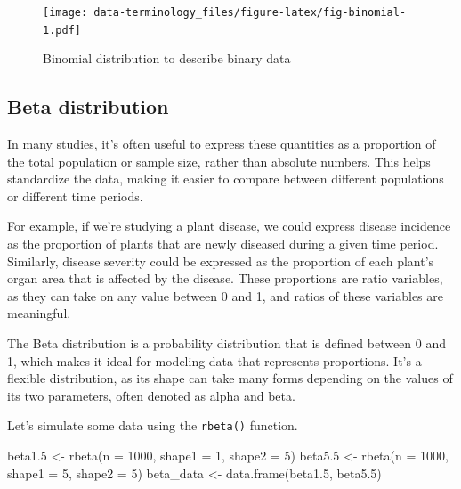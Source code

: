 \documentclass[
  letterpaper,
]{book}
\newenvironment{Shaded}{\begin{snugshade}}{\end{snugshade}}
\newcommand{\AttributeTok}[1]{\textcolor[rgb]{0.40,0.45,0.13}{#1}}
\newcommand{\DecValTok}[1]{\textcolor[rgb]{0.68,0.00,0.00}{#1}}
\newcommand{\FloatTok}[1]{\textcolor[rgb]{0.68,0.00,0.00}{#1}}
\newcommand{\FunctionTok}[1]{\textcolor[rgb]{0.28,0.35,0.67}{#1}}
\newcommand{\NormalTok}[1]{\textcolor[rgb]{0.00,0.23,0.31}{#1}}
\newcommand{\OtherTok}[1]{\textcolor[rgb]{0.00,0.23,0.31}{#1}}
\begin{document}
\begin{figure}

\texttt{[image: data-terminology\_files/figure-latex/fig-binomial-1.pdf]} \hfill{}

\caption{\label{fig-binomial}Binomial distribution to describe binary
data}

\end{figure}

\hypertarget{beta-distribution}{%
\subsection{Beta distribution}\label{beta-distribution}}

In many studies, it's often useful to express these quantities as a
proportion of the total population or sample size, rather than absolute
numbers. This helps standardize the data, making it easier to compare
between different populations or different time periods.

For example, if we're studying a plant disease, we could express disease
incidence as the proportion of plants that are newly diseased during a
given time period. Similarly, disease severity could be expressed as the
proportion of each plant's organ area that is affected by the disease.
These proportions are ratio variables, as they can take on any value
between 0 and 1, and ratios of these variables are meaningful.

The Beta distribution is a probability distribution that is defined
between 0 and 1, which makes it ideal for modeling data that represents
proportions. It's a flexible distribution, as its shape can take many
forms depending on the values of its two parameters, often denoted as
alpha and beta.

Let's simulate some data using the \texttt{rbeta()} function.

\begin{Shaded}
\begin{Highlighting}[]
\NormalTok{beta1}\FloatTok{.5} \OtherTok{\textless{}{-}} \FunctionTok{rbeta}\NormalTok{(}\AttributeTok{n =} \DecValTok{1000}\NormalTok{, }\AttributeTok{shape1 =} \DecValTok{1}\NormalTok{, }\AttributeTok{shape2 =} \DecValTok{5}\NormalTok{)}
\NormalTok{beta5}\FloatTok{.5} \OtherTok{\textless{}{-}} \FunctionTok{rbeta}\NormalTok{(}\AttributeTok{n =} \DecValTok{1000}\NormalTok{, }\AttributeTok{shape1 =} \DecValTok{5}\NormalTok{, }\AttributeTok{shape2 =} \DecValTok{5}\NormalTok{)}
\NormalTok{beta\_data }\OtherTok{\textless{}{-}} \FunctionTok{data.frame}\NormalTok{(beta1}\FloatTok{.5}\NormalTok{, beta5}\FloatTok{.5}\NormalTok{)}
\end{Highlighting}
\end{Shaded}
\end{document}
